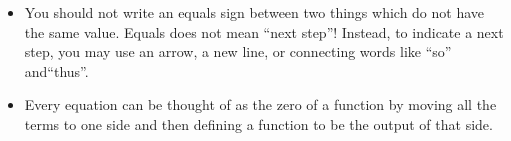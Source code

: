\documentclass{ximera}
\begin{document}
\begin{summary}\begin{itemize}
\item You should not write an equals sign between two things which do not have the same value.  Equals does not mean ``next step''!  Instead, to indicate a next step, you may use an arrow, a new line, or connecting words like ``so'' and``thus''.
\item  Every equation can be thought of as the zero of a function by moving all the terms to one side and then defining a function to be the output of that side.
\end{itemize}\end{summary}



\end{document}
